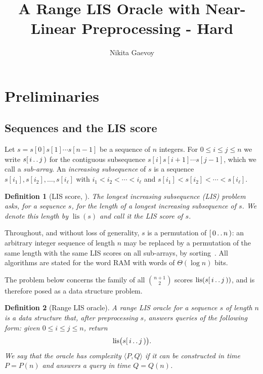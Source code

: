 \documentclass[10pt]{article}
\title{A Range LIS Oracle with Near-Linear Preprocessing - Hard}
\author{Nikita Gaevoy}
\date{}
\newtheorem{definition}{Definition}
\newcommand{\lis}{\operatorname{lis}}
\begin{document}
\maketitle

\section{Preliminaries}

\subsection{Sequences and the LIS score}

Let $s=s[0]s[1]\cdots s[n-1]$ be a sequence of $n$ integers. For
$0\le i\le j\le n$ we write $s[\,i\mathinner{.\,.}j\,)$ for the contiguous
subsequence $s[i]s[i+1]\cdots s[j-1]$, which we call a \emph{sub-array}. An
\emph{increasing subsequence} of $s$ is a sequence
$s[i_1],s[i_2],\ldots,s[i_\ell]$ with $i_1<i_2<\cdots<i_\ell$ and
$s[i_1]<s[i_2]<\cdots<s[i_\ell]$.

\begin{definition}[LIS score, {\cite[Definition 8.1]{TiskinArXiv}}]\label{def:lis}
The \emph{longest increasing subsequence} (LIS) problem asks, for a sequence
$s$, for the length of a longest increasing subsequence of $s$. We denote this
length by $\lis(s)$ and call it the \emph{LIS score} of $s$.
\end{definition}

Throughout, and without loss of generality, $s$ is a permutation of
$[\,0\mathinner{.\,.}n\,)$: an arbitrary integer sequence of length $n$ may be replaced by
a permutation of the same length with the same LIS scores on all sub-arrays, by
sorting~\cite[Section 5]{GGK25}. All algorithms are stated for the word RAM
with words of $\Theta(\log n)$ bits.

The problem below concerns the family of all $\binom{n+1}{2}$ scores
$\lis(s[\,i\mathinner{.\,.}j\,))$, and is therefore posed as a data structure problem.

\begin{definition}[Range LIS oracle]\label{def:oracle}
A \emph{range LIS oracle} for a sequence $s$ of length $n$ is a data structure
that, after preprocessing $s$, answers queries of the following form: given
$0\le i\le j\le n$, return
\[
\lis\bigl(s[\,i\mathinner{.\,.}j\,)\bigr).
\]
We say that the oracle has \emph{complexity} $\langle P,Q\rangle$ if it can be
constructed in time $P=P(n)$ and answers a query in time $Q=Q(n)$.
\end{definition}
\end{document}
